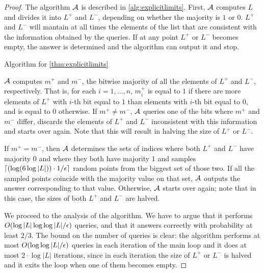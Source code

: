 \begin{proof}

The algorithm $\mathcal{A}$ is described in \cref{alg:explicitlimits}. First, $\mathcal{A}$ computes $L$ and divides it into
$L^+$ and $L^-$, depending on whether the majority is $1$ or $0$. $L^+$ and $L^-$ will mantain at all times the elements
of the list that are consistent with the information obtained by the queries. If at any point
$L^+$ or $L^-$ becomes empty, the answer is determined and the algorithm can output it and stop. 

\begin{algorithm}
\caption{Algorithm for \cref{thm:explicitlimits}}\label{alg:explicitlimits}
\begin{algorithmic}

\end{algorithmic}
\end{algorithm}
    

$\mathcal{A}$ computes $m^+$ and $m^-$, the bitwise majority of all the elements of $L^+$ and $L^-$, respectively.
That is, for each $i = 1, \ldots, n$, $m^+_i$ is equal to $1$ if there are more elements of $L^+$ with $i$-th bit
equal to $1$ than elements with $i$-th bit equal to $0$, and is equal to $0$ otherwise. If $m^+ \neq m^-$, $\mathcal{A}$
queries one of the bits where $m^+$ and $m^-$ differ, discards the elements of $L^+$ and $L^-$ inconsistent with 
this information and starts over again. Note that this will result in halving the size of $L^+$ or $L^-$. 

If $m^+ = m^-$, then $\mathcal{A}$ determines the sets of indices where both $L^+$ and $L^-$ have majority $0$ 
and where they both have majority $1$ and samples $\lceil (\log (6 \log |L|)) \cdot 1/\epsilon \rceil$ random points
from the biggest set of those two. If all the sampled points coincide with the majority value on that 
set, $\mathcal{A}$ outputs the answer corresponding to that value. Otherwise, $\mathcal{A}$ starts over again; note that in
this case, the sizes of both $L^+$ and $L^-$ are halved.  

We proceed to the analysis of the algorithm. We have to argue that it performs $O(\log |L| \log \log |L| / \epsilon)$ queries, and
that it answers correctly with probability at least $2/3$. The bound on the number of queries is clear: 
the algorithm performs at most $O(\log \log |L| /\epsilon)$ queries in each iteration of the main loop
and it does at most $2 \cdot \log |L|$ iterations, since in each iteration the size 
of $L^+$ or $L^-$ is halved and it exits the loop when one of them becomes empty.


\end{proof}
